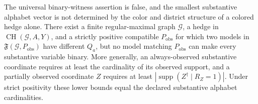 The universal binary-witness assertion is false, and the smallest substantive alphabet vector is not determined by the color and district structure of a colored hedge alone. There exist a finite regular-maximal graph \(\mathcal G\), a hedge in \(\operatorname{CH}(\mathcal G,A,Y)\), and a strictly positive compatible \(P_{\mathrm{obs}}\) for which two models in \(\mathfrak F(\mathcal G,P_{\mathrm{obs}})\) have different \(Q_a\), but no model matching \(P_{\mathrm{obs}}\) can make every substantive variable binary. More generally, an always-observed substantive coordinate requires at least the cardinality of its observed support, and a partially observed coordinate \(Z\) requires at least \(|\operatorname{supp}(Z^{\dagger}\mid R_Z=1)|\). Under strict positivity these lower bounds equal the declared substantive alphabet cardinalities.